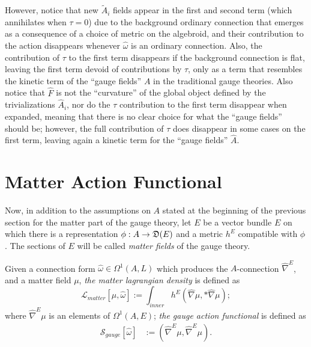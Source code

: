 However, notice that new $\tilde A_i$ fields appear in the first and second term (which annihilates when $\tau = 0$) due to the background ordinary connection that emerges as a consequence of a choice of metric on the algebroid, and their contribution to the action disappears whenever $\hat \omega$ is an ordinary connection. Also, the contribution of $\tau$ to the first term disappears if the background connection is flat, leaving the first term devoid of contributions by $\tau$, only as a term that resembles the kinetic term of the ``gauge fields'' $A$ in the traditional gauge theories. Also notice that $\hat F$ is not the ``curvature'' of the global object defined by the trivializations $\hat A_i$, nor do the $\tau$ contribution to the first term disappear when expanded, meaning that there is no clear choice for what the ``gauge fields'' should be; however, the full contribution of $\tau$ does disappear in some cases on the first term, leaving again a kinetic term for the ``gauge fields'' $\hat A$.

\section{Matter Action Functional}

Now, in addition to the assumptions on $A$ stated at the beginning of the previous section for the matter part of the gauge theory, let $E$ be a vector bundle $E$ on which there is a representation $\phi: A \to \alg D(E)$ and a metric $h^E$ compatible with $\phi$. The sections of $E$ will be called \emph{matter fields} of the gauge theory.

\begin{definition}\label{definitionMatterActionLagrangian}
Given a connection form $\hat \omega \in \Omega^1(A, L)$ which produces the $A$-connection $\hat \nabla^E$, and a matter field $\mu$, \emph{the matter lagrangian density} is defined as
\begin{equation}
    \mathcal L_{matter}[\mu, \hat \omega] := \int_{inner} h^E(\hat \nabla \mu, *\hat \nabla \mu);
\end{equation}
where $\hat \nabla^E \mu$ is an elements of $\Omega^1(A,E)$; \emph{the gauge action functional} is defined as 
\begin{align}
    \mathcal S_{gauge}[\hat \omega]& := (\hat \nabla^E \mu, \hat \nabla^E \mu).
\end{align}
\end{definition}

